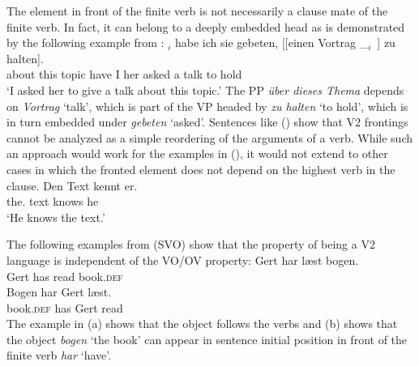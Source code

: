 \zl
\eal
{}
\zl
\eal
{}
\zl
The element in front of the finite verb is not necessarily a clause mate of the finite verb. In
fact, it can belong to a deeply embedded head as is demonstrated by the following example from
:
\ea
{}$_i$ habe ich sie gebeten, [[einen Vortrag \_$_i$~] zu halten].\footnotemark\\
     \spacebr{}about this topic  have I her asked \hphantom{[[}a talk {} to hold\\\german
{}
\glt `I asked her to give a talk about this topic.'
\z
The PP \emph{über dieses Thema} depends on \emph{Vortrag} `talk', which is part of the VP headed by
\emph{zu halten} `to hold', which is in turn embedded under \emph{gebeten} `asked'. Sentences like
() show that V2 frontings cannot be analyzed as a simple reordering of the arguments of a
verb. While such an approach would work for the examples in (), it would not extend to other
cases in which the fronted element does not depend on the highest verb in the clause.
\ea
\gll Den Text kennt er.\\
     the.\ACC{} text knows he\\
\glt `He knows the text.'
\z

\noindent
The following examples from  (SVO) show that the property of being a V2
language is independent of the VO/OV property:
\eal
\ex 
\gll Gert har læst bogen.\\
     Gert has read book.\textsc{def}\\\danish
\ex
\gll Bogen har Gert læst.\\
     book.\textsc{def} has Gert read\\
\zl
The example in (a) shows that the object follows the verbs and (b) shows that the
object \emph{bogen} `the book' can appear in sentence initial position in front of the finite verb
\emph{har} `have'.

